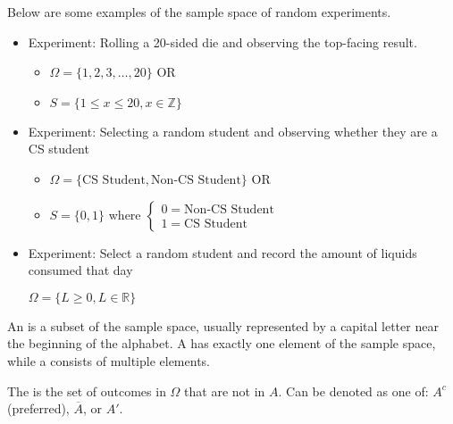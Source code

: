 \begin{example}
    Below are some examples of the sample space of random experiments. 

    \begin{itemize}
        \item Experiment: Rolling a 20-sided die and observing the top-facing result.

        \begin{itemize}
            \item $\Omega = \{ 1, 2, 3, \dots, 20 \}$ OR 
            \item $S = \{ 1 \le x \le 20, x \in \mathbb{Z} \}$
        \end{itemize}

        \item Experiment: Selecting a random student and observing whether they are a CS student

        \begin{itemize}
            \item $\Omega = \{ \text{CS Student}, \text{Non-CS Student} \}$ OR
            \item $S = \{ 0, 1 \}$ where $\begin{cases} 0 = \text{Non-CS Student} \\ 1 = \text{CS Student} \end{cases}$
        \end{itemize}

        \item Experiment: Select a random student and record the amount of liquids consumed that day 

        $\Omega = \{ L \ge 0, L \in \mathbb{R} \}$
    \end{itemize}
\end{example}

\begin{definition}[Event]
    An  is a subset of the sample space, usually represented by a capital letter near the beginning of the alphabet. A  has exactly one element of the sample space, while a  consists of multiple elements.
\end{definition}

\begin{definition}
    The  is the set of outcomes in $\Omega$ that are not in $A$. Can be denoted as one of: $A^c$ (preferred), $\overline{A}$, or $A'$. 
\end{definition}


